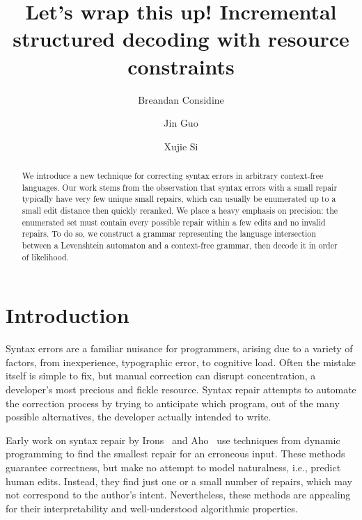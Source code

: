 \documentclass[runningheads]{llncs}
\begin{document}
%
\title{Let's wrap this up! Incremental structured decoding with resource constraints}
%
%
\author{Breandan Considine \and
Jin Guo\and
Xujie Si}
%
%
%
\maketitle              %
%
\begin{abstract}
  We introduce a new technique for correcting syntax errors in arbitrary context-free languages. Our work stems from the observation that syntax errors with a small repair typically have very few unique small repairs, which can usually be enumerated up to a small edit distance then quickly reranked. We place a heavy emphasis on precision: the enumerated set must contain every possible repair within a few edits and no invalid repairs. To do so, we construct a grammar representing the language intersection between a Levenshtein automaton and a context-free grammar, then decode it in order of likelihood.
\end{abstract}
%
%
%

  \section{Introduction}

  Syntax errors are a familiar nuisance for programmers, arising due to a variety of factors, from inexperience, typographic error, to cognitive load. Often the mistake itself is simple to fix, but manual correction can disrupt concentration, a developer's most precious and fickle resource. Syntax repair attempts to automate the correction process by trying to anticipate which program, out of the many possible alternatives, the developer actually intended to write.

  Early work on syntax repair by Irons~\cite{irons1963error} and Aho~\cite{aho1972minimum} use techniques from dynamic programming to find the smallest repair for an erroneous input. These methods guarantee correctness, but make no attempt to model naturalness, i.e., predict human edits. Instead, they find just one or a small number of repairs, which may not correspond to the author's intent. Nevertheless, these methods are appealing for their interpretability and well-understood algorithmic properties.
\end{document}
